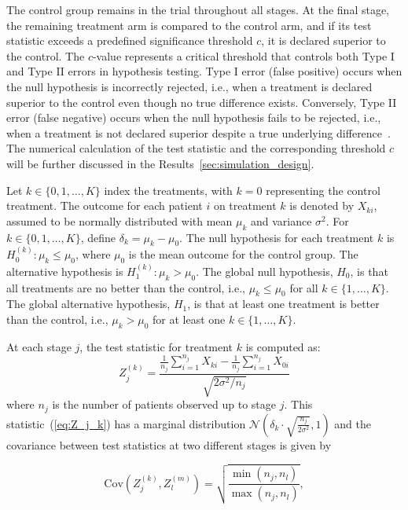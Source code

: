 \documentclass[11pt, a4paper]{article}\usepackage[]{graphicx}\usepackage[]{xcolor}
\begin{document}
The control group remains in the trial throughout all stages. At the final stage, the remaining treatment arm is compared to the control arm, and if its test statistic exceeds a predefined significance threshold \( c \), it is declared superior to the control. The \( c \)-value represents a critical threshold that controls both Type I and Type II errors in hypothesis testing. Type I error (false positive) occurs when the null hypothesis is incorrectly rejected, i.e., when a treatment is declared superior to the control even though no true difference exists. Conversely, Type II error (false negative) occurs when the null hypothesis fails to be rejected, i.e., when a treatment is not declared superior despite a true underlying difference~\citep{bland2015introduction}. The numerical calculation of the test statistic and the corresponding threshold \( c \) will be further discussed in the Results~\ref{sec:simulation_design}.

Let $k \in \{0, 1, \dots, K\}$ index the treatments, with $k=0$ representing the control treatment. The outcome for each patient $i$ on treatment $k$ is denoted by $X_{ki}$, assumed to be normally distributed with mean $\mu_k$ and variance $\sigma^2$. For \( k \in \{0, 1, \dots, K\} \), define \( \delta_k = \mu_k - \mu_0 \). The null hypothesis for each treatment $k$ is $H_0^{(k)}: \mu_k \leq \mu_0$, where $\mu_0$ is the mean outcome for the control group. The alternative hypothesis is $H_1^{(k)}: \mu_k > \mu_0$. The global null hypothesis, $H_0$, is that all treatments are no better than the control, i.e., $\mu_k \leq \mu_0$ for all $k \in \{1, \dots, K\}$. The global alternative hypothesis, $H_1$, is that at least one treatment is better than the control, i.e., $\mu_k > \mu_0$ for at least one $k \in \{1, \dots, K\}$.

At each stage $j$, the test statistic for treatment $k$ is computed as:
\begin{equation}
Z_j^{(k)} = \frac{\frac{1}{n_j}\sum_{i=1}^{n_j} X_{ki} - \frac{1}{n_j}\sum_{i=1}^{n_j} X_{0i}}{\sqrt{2\sigma^2 / n_j}}\label{eq:Z_j_k}
\end{equation}
where $n_j$ is the number of patients observed up to stage $j$. This statistic~(\ref{eq:Z_j_k}) has a marginal distribution $\mathcal{N}\left(\delta_k \cdot \sqrt{\frac{n_j}{2\sigma^2}}, 1\right)$ and the covariance between test statistics at two different stages is given by

\begin{equation}\label{eq:covariance_method1}
\text{Cov}(Z_j^{(k)}, Z_l^{(m)}) = \sqrt{\frac{\min(n_j, n_l)}{\max(n_j, n_l)}},
\end{equation}
\end{document}
